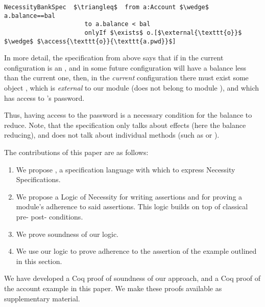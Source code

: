  \begin{lstlisting}[language = Chainmail, mathescape=true, frame=lines]
NecessityBankSpec  $\triangleq$  from a:Account $\wedge$ a.balance==bal
                      to a.balance < bal
                      onlyIf $\exists$ o.[$\external{\texttt{o}}$ $\wedge$ $\access{\texttt{o}}{\texttt{a.pwd}}$]
\end{lstlisting}
 
  
 In more detail, the specification from above says that if in the current
 configuration  is an ,
 and in some future configuration  will have a balance less than the current one, then, in the \emph{current} configuration
 there must exist some object , which is \emph{external} to our module (does not belong to module
 ), and which has access to 's password.
 
 
 Thus, having access to the password is a necessary condition for the balance to reduce.
 Note, that the specification only talks about effects (here the balance reducing), and does not
 talk about individual methods (such as  or ).
 
   
 The contributions of this paper are as follows:
 
 \begin{enumerate}
 \item
 We propose \Chainmail, a specification language with which to
express Necessity Specifications. 
 \item
  We propose a Logic of Necessity for writing assertions and for proving a module's adherence to said assertions.
 This logic builds on top of classical pre- post- conditions.
 \item
 We prove soundness of our logic.  
 \item
 We use our logic to prove adherence to the assertion of the example
outlined  in this section.
 \end{enumerate}
 
 We have developed a Coq proof of soundness of our approach, and a Coq proof of the
 account example in this paper. We make these proofs available as supplementary material.



